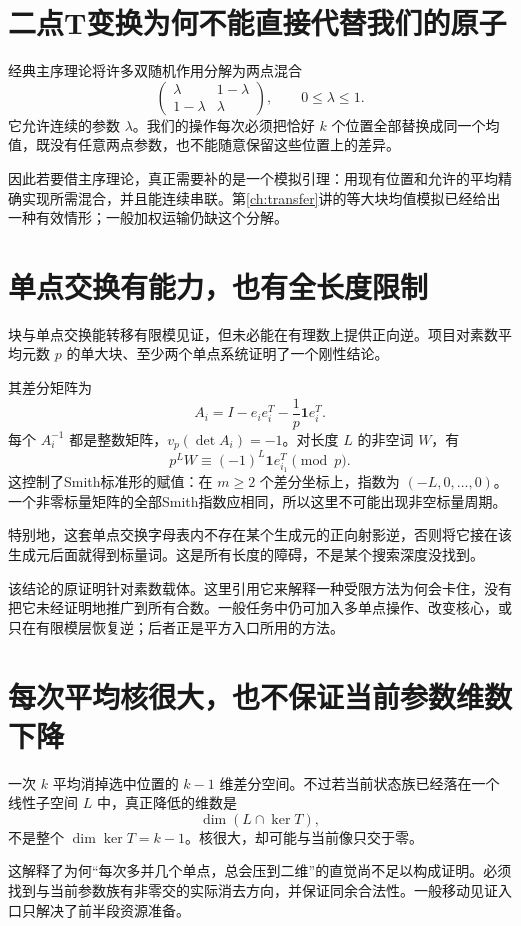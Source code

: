 \section{二点T变换为何不能直接代替我们的原子}
经典主序理论将许多双随机作用分解为两点混合
\[\begin{pmatrix}\lambda&1-\lambda\\1-\lambda&\lambda\end{pmatrix},
\qquad0\le\lambda\le1.
\]
它允许连续的参数 $\lambda$。我们的操作每次必须把恰好 $k$ 个位置全部替换成同一个均值，既没有任意两点参数，也不能随意保留这些位置上的差异。

因此若要借主序理论，真正需要补的是一个模拟引理：用现有位置和允许的平均精确实现所需混合，并且能连续串联。第\ref{ch:transfer}讲的等大块均值模拟已经给出一种有效情形；一般加权运输仍缺这个分解。

\section{单点交换有能力，也有全长度限制}
块与单点交换能转移有限模见证，但未必能在有理数上提供正向逆。项目对素数平均元数 $p$ 的单大块、至少两个单点系统证明了一个刚性结论。

其差分矩阵为
\[A_i=I-e_ie_i^T-\frac1p\mathbf1e_i^T.
\]
每个 $A_i^{-1}$ 都是整数矩阵，$v_p(\det A_i)=-1$。对长度 $L$ 的非空词 $W$，有
\[p^LW\equiv(-1)^L\mathbf1e_{i_1}^T\pmod p.
\]
这控制了Smith标准形的赋值：在 $m\ge2$ 个差分坐标上，指数为 $(-L,0,\ldots,0)$。一个非零标量矩阵的全部Smith指数应相同，所以这里不可能出现非空标量周期。

特别地，这套单点交换字母表内不存在某个生成元的正向射影逆，否则将它接在该生成元后面就得到标量词。这是所有长度的障碍，不是某个搜索深度没找到。

该结论的原证明针对素数载体。这里引用它来解释一种受限方法为何会卡住，没有把它未经证明地推广到所有合数。一般任务中仍可加入多单点操作、改变核心，或只在有限模层恢复逆；后者正是平方入口所用的方法。

\section{每次平均核很大，也不保证当前参数维数下降}
一次 $k$ 平均消掉选中位置的 $k-1$ 维差分空间。不过若当前状态族已经落在一个线性子空间 $L$ 中，真正降低的维数是
\[\dim(L\cap\ker T),
\]
不是整个 $\dim\ker T=k-1$。核很大，却可能与当前像只交于零。

这解释了为何“每次多并几个单点，总会压到二维”的直觉尚不足以构成证明。必须找到与当前参数族有非零交的实际消去方向，并保证同余合法性。一般移动见证入口只解决了前半段资源准备。

